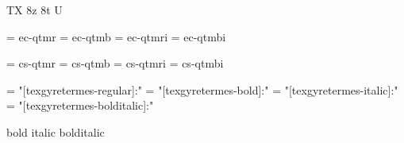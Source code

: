 
\ifx\ffdecl\undefined  \fi

\ffdecl [TG Termes] {\caps} {\rm \bf \it \bi} {} {TX} {8z 8t U}

\def\caps{\ffsetV{caps}{-sc}\ffsetX}  \def\nocaps{\ffsetV{caps}{}\ffsetX}
\def\capsV{} 

\ismacro{}\ifttrue

   \font\tenrm = ec-qtmr  \sizespec
   \font\tenbf = ec-qtmb  \sizespec
   \font\tenit = ec-qtmri \sizespec
   \font\tenbi = ec-qtmbi \sizespec

   \def\ffnamegen{ec-qtm\ffvarV\capsV}

\fi

\ismacro{}\iftrue

   \font\tenrm = cs-qtmr  \sizespec
   \font\tenbf = cs-qtmb  \sizespec
   \font\tenit = cs-qtmri \sizespec
   \font\tenbi = cs-qtmbi \sizespec

   \def\ffnamegen{cs-qtm\ffvarV\capsV}
   

\fi

\ismacro{}\iftrue

   \font\tenrm = "[texgyretermes-regular]:\fontfeatures"    \sizespec
   \font\tenbf = "[texgyretermes-bold]:\fontfeatures"       \sizespec
   \font\tenit = "[texgyretermes-italic]:\fontfeatures"     \sizespec
   \font\tenbi = "[texgyretermes-bolditalic]:\fontfeatures" \sizespec

   \def\ffnamegen{"[texgyretermes-\ffvarV]:\capsV\fontfeatures"} 

    {bold} {italic} {bolditalic}
   \def\caps{\ffsetV{caps}{+smcp;}\ffsetX}

\fi
\tenrm %

\ifx\loadmathfonts\relax \endinput \fi
\ifx\mathpreloaded X\else  \fi                     

\endinput
